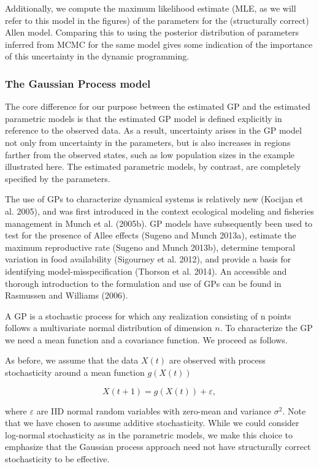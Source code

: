 \documentclass[author-year, 12pt,review]{components/elsarticle} %
\begin{document}
Additionally, we compute the maximum likelihood estimate (MLE, as we
will refer to this model in the figures) of the parameters for the
(structurally correct) Allen model. Comparing this to using the
posterior distribution of parameters inferred from MCMC for the same
model gives some indication of the importance of this uncertainty in the
dynamic programming.

\subsubsection{The Gaussian Process
model}\label{the-gaussian-process-model}

The core difference for our purpose between the estimated GP and the
estimated parametric models is that the estimated GP model is defined
explicitly in reference to the observed data. As a result, uncertainty
arises in the GP model not only from uncertainty in the parameters, but
is also increases in regions farther from the observed states, such as
low population sizes in the example illustrated here. The estimated
parametric models, by contrast, are completely specified by the
parameters.

The use of GPs to characterize dynamical systems is relatively new
(Kocijan et al. 2005), and was first introduced in the context
ecological modeling and fisheries management in Munch et al. (2005b). GP
models have subsequently been used to test for the presence of Allee
effects (Sugeno and Munch 2013a), estimate the maximum reproductive rate
(Sugeno and Munch 2013b), determine temporal variation in food
availability (Sigourney et al. 2012), and provide a basis for
identifying model-misspecification (Thorson et al. 2014). An accessible
and thorough introduction to the formulation and use of GPs can be found
in Rasmussen and Williams (2006).

A GP is a stochastic process for which any realization consisting of n
points follows a multivariate normal distribution of dimension \(n\). To
characterize the GP we need a mean function and a covariance function.
We proceed as follows.

As before, we assume that the data \(X(t)\) are observed with process
stochasticity around a mean function \(g(X(t))\)

\begin{equation}
X(t+1) = g(X(t)) + \varepsilon,
\end{equation}

where \(\varepsilon\) are IID normal random variables with zero-mean and
variance \(\sigma^2\). Note that we have chosen to assume additive
stochasticity. While we could consider log-normal stochasticity as in
the parametric models, we make this choice to emphasize that the
Gaussian process approach need not have structurally correct
stochasticity to be effective.
\end{document}
